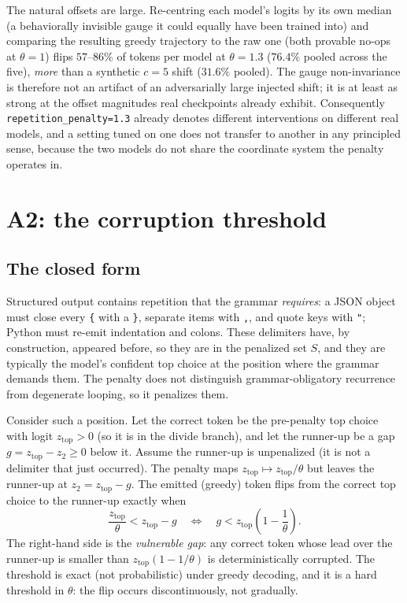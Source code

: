 \documentclass[11pt]{article}
\newcommand{\ztop}{z_{\mathrm{top}}}
\newcommand{\thp}{\theta}
\newcommand{\code}[1]{\texttt{#1}}
\begin{document}
The natural offsets are large. Re-centring each model's
logits by its own median (a behaviorally invisible gauge it could equally have been trained
into) and comparing the resulting greedy trajectory to the raw one (both provable no-ops at
$\thp=1$) flips $57$--$86\%$ of tokens per model at $\thp=1.3$ ($76.4\%$ pooled across the
five), \emph{more} than a synthetic $c=5$ shift ($31.6\%$ pooled). The gauge non-invariance is therefore not an artifact
of an adversarially large injected shift; it is at least as strong at the offset magnitudes
real checkpoints already exhibit. Consequently \code{repetition\_penalty=1.3}
already denotes different interventions on different real models, and a setting tuned on
one does not transfer to another in any principled sense, because the two models do not
share the coordinate system the penalty operates in.

\section{A2: the corruption threshold}
\label{sec:a2}

\subsection{The closed form}
\label{sec:a2-theory}

Structured output contains repetition that the grammar \emph{requires}: a JSON object must
close every \code{\{} with a \code{\}}, separate items with \code{,}, and quote keys with
\code{"}; Python must re-emit indentation and colons. These delimiters have, by
construction, appeared before, so they are in the penalized set $S$, and they are typically
the model's confident top choice at the position where the grammar demands them. The
penalty does not distinguish grammar-obligatory recurrence from degenerate looping, so it
penalizes them.

Consider such a position. Let the correct token be the pre-penalty top choice with logit
$\ztop > 0$ (so it is in the divide branch), and let the runner-up be a gap $g = \ztop -
z_2 \ge 0$ below it. Assume the runner-up is unpenalized (it is not a delimiter that just
occurred). The penalty maps $\ztop \mapsto \ztop/\thp$ but leaves the runner-up at
$z_2 = \ztop - g$. The emitted (greedy) token flips from the correct top choice to the
runner-up exactly when
\begin{equation}
\label{eq:threshold}
\frac{\ztop}{\thp} < \ztop - g
\quad\Longleftrightarrow\quad
g < \ztop\!\left(1 - \frac{1}{\thp}\right).
\end{equation}
The right-hand side is the \emph{vulnerable gap}: any correct token whose lead over the
runner-up is smaller than $\ztop(1-1/\thp)$ is deterministically corrupted. The
threshold is exact (not probabilistic) under greedy decoding, and it is a hard threshold in
$\thp$: the flip occurs discontinuously, not gradually.
\end{document}
